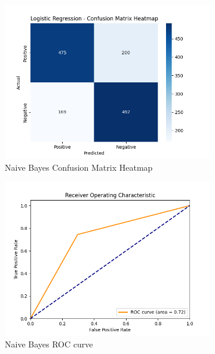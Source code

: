 \documentclass[conference]{IEEEtran}
\begin{document}
\begin{figure}[htbp]
    \begin{subfigure}{0.5\textwidth}
        \centering
        \includegraphics[width=\linewidth]{"../images/logistic_regression/confusion_matrix_heatmap.png"}
        \caption{Naive Bayes Confusion Matrix Heatmap}
        \label{fig:naive_bayes_1}
    \end{subfigure}
    \begin{subfigure}{0.5\textwidth}
        \centering
        \includegraphics[width=\linewidth]{"../images/logistic_regression/roc_curve.png"}
        \caption{Naive Bayes ROC curve}
        \label{fig:navie_bayes_2}
    \end{subfigure}
    \begin{subfigure}{0.5\textwidth}

\end{subfigure}
\end{figure}
\end{document}
